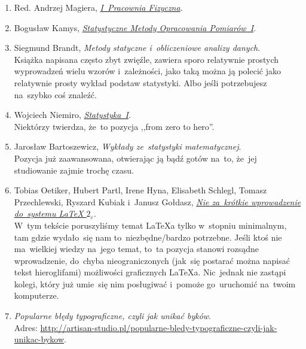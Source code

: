 \documentclass[a4paper,11pt]{article}
\begin{document}
\begin{enumerate}
\item Red. Andrzej Magiera,
  \href{http://www.1pf.if.uj.edu.pl/documents/5046939/5227638/skrypt.pdf}{\emph{I~Pracownia
      Fizyczna}}.

\item Bogusław Kamys,
  \href{http://users.uj.edu.pl/\~ufkamys/BK/smop1N\_h.pdf}{\emph{Statystyczne
      Metody Opracowania Pomiarów~I}}.

\item Siegmund Brandt, \emph{Metody statyczne i~obliczeniowe analizy
    danych}. \\
  Książka napisana często zbyt zwięźle, zawiera sporo relatywnie
  prostych wyprowadzeń wielu wzorów i~zależności, jako taką można ją
  polecić jako relatywnie prosty wykład podstaw statystyki. Albo jeśli
  potrzebujesz na~szybko coś znaleźć.

\item Wojciech Niemiro, \href{https://www.mimuw.edu.pl/~pokar/StatystykaI/Literatura/NiemiroBook.pdf}{\emph{Statystyka~I}}. \\
  Niektórzy twierdza, że~to pozycja ,,from zero to hero''.

\item Jarosław Bartoszewicz, \emph{Wykłady ze~statystyki matematycznej}. \\
  Pozycja już zaawansowana, otwierając ją bądź gotów na~to, że~jej
  studiowanie zajmie trochę czasu.

\item Tobias Oetiker, Hubert Partl, Irene Hyna, Elisabeth Schlegl, Tomasz Przechlewski, Ryszard Kubiak i~Janusz Gołdasz, \href{http://www.ptep-online.com/ctan/lshort_polish.pdf}{\emph{Nie za~krótkie wprowadzenie do~systemu \LaTeX{} $2_{ \varepsilon }$}}. \\
  W~tym tekście poruszyliśmy temat \LaTeX a tylko w~stopniu
  minimalnym, tam gdzie wydało~się nam to~niezbędne/bardzo potrzebne.
  Jeśli ktoś nie ma~wielkiej wiedzy na~jego temat, to~ta pozycja
  stanowi rozsądne wprowadzenie, do~chyba nieograniczonych (jak~się
  postarać można napisać tekst hieroglifami) możliwości graficznych
  \LaTeX a. Nic~jednak nie zastąpi kolegi, który już umie~się nim
  posługiwać i~pomoże go~uruchomić na~twoim komputerze.
  
\item \emph{Popularne
    błędy typograficzne, czyli jak unikać byków}. \\
  Adres:
  \href{http://artisan-studio.pl/popularne-bledy-typograficzne-czyli-jak-unikac-bykow}{http://artisan-studio.pl/popularne-bledy-typograficzne-czyli-jak-unikac-bykow}.


\end{enumerate}
\end{document}
